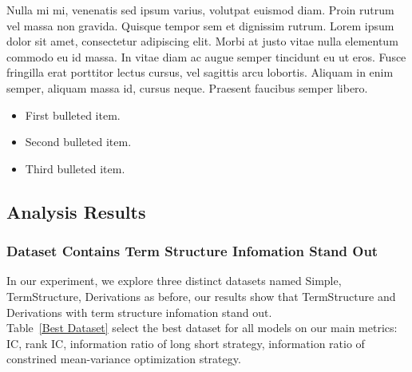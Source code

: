 \documentclass[10pt,letterpaper]{article}
\begin{document}
Nulla mi mi, venenatis sed ipsum varius, volutpat euismod diam. Proin rutrum vel massa non gravida. Quisque tempor sem et dignissim rutrum. Lorem ipsum dolor sit amet, consectetur adipiscing elit. Morbi at justo vitae nulla elementum commodo eu id massa. In vitae diam ac augue semper tincidunt eu ut eros. Fusce fringilla erat porttitor lectus cursus, vel sagittis arcu lobortis. Aliquam in enim semper, aliquam massa id, cursus neque. Praesent faucibus semper libero.

\begin{itemize}
	\item First bulleted item.
	\item Second bulleted item.
	\item Third bulleted item.
\end{itemize}


\subsection*{Analysis Results}
\subsubsection*{Dataset Contains Term Structure Infomation Stand Out}
In our experiment, we explore three distinct datasets named Simple, TermStructure, Derivations as before, our results show that TermStructure and Derivations with term structure infomation stand out.
\\Table~\ref{Best Dataset} select the best dataset for all models on our main metrics: IC, rank IC, information ratio of long short strategy, information ratio of constrined mean-variance optimization strategy.
\end{document}
